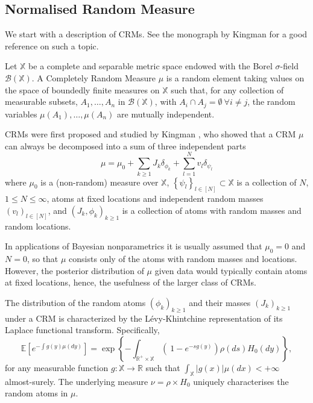 \subsection{Normalised Random Measure}
We start with a description of \glspl{CRM}.
See the monograph by Kingman \cite{kingman-poisson-processes} for a good reference on such a topic. \\

\begin{definition} \label{def:CRM}
Let $\mathbb{X}$ be a complete and separable metric space endowed with the Borel $\sigma$-field $\mathcal{B}(\mathbb{X})$. A Completely Random Measure $\mu$ is a random element taking values on the space of boundedly finite measures on $\mathbb{X}$ such that, for any collection of measurable subsets, $A_1, \dots , A_n$ in $\mathcal{B}(\mathbb{X})$, with $A_i \cap  A_j = \emptyset \ \forall i \neq j$, the random variables $\mu(A_1), \dots, \mu(A_n)$ are mutually independent.
\end{definition}

\glspl{CRM} were first proposed and studied by Kingman \cite{Kingman:1967kn}, who showed that a \gls{CRM} $\mu$ can always be decomposed into a sum of three independent parts
$$ \mu = \mu_0 + \sum_{k \ge 1}{J_k \delta_{\phi_k}} + \sum_{l=1}^N{v_l \delta_{\psi_l}} $$
where $\mu_0$ is a (non-random) measure over $\mathbb{X}$, $\left\{ \psi_l \right\}_{l \in [N]} \subset  \mathbb{X}$ is a collection of $N$, $1 \le N \le \infty$, atoms at fixed locations and independent random masses $\left(v_l \right)_{l \in [N]}$, and $\left(J_k, \phi_k \right)_{k \ge 1}$ is a collection of atoms with random masses and random locations.

In applications of Bayesian nonparametrics it is usually assumed that $\mu_0 = 0$ and $N = 0$, so that $\mu$ consists only of the atoms with random masses and locations. However, the posterior distribution of $\mu$ given data would typically contain atoms at fixed locations, hence, the usefulness of the larger class of \glspl{CRM}.

The distribution of the random atoms $\left(\phi_k \right)_{k \ge 1}$ and their masses $\left(J_k \right)_{k \ge 1}$ under a \gls{CRM} is characterized by the Lévy-Khintchine representation of its Laplace functional transform. Specifically,
\begin{equation} \label{eq:levy}
\mathbb{E} \left[e^{-\int g(y)\mu(dy)} \right] = \exp \left\{ - \int_{\mathbb{R}^+ \times \mathbb{X}} \left( \  1 - e^{-sg(y)} \right) \rho(ds) H_0(dy) \right\},
\end{equation}
for any measurable function $g: \mathbb{X} \rightarrow \mathbb{R}$ such that $\int_{\mathbb{X}}|g(x)|\mu(dx)<+ \infty$ almost-surely.
The underlying measure $\nu = \rho \times H_0$ uniquely characterises the random atoms in $\mu$.

